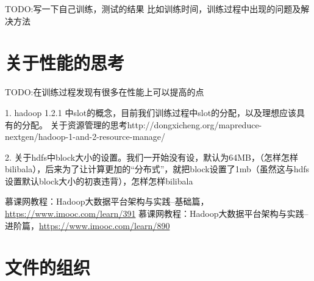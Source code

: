 \documentclass[forprint]{myreport}
\begin{document}
TODO:写一下自己训练，测试的结果
比如训练时间，训练过程中出现的问题及解决方法

\chapter{关于性能的思考}

TODO:在训练过程发现有很多在性能上可以提高的点

1. hadoop 1.2.1 中slot的概念，目前我们训练过程中slot的分配，以及理想应该具有的分配。
关于资源管理的思考http://dongxicheng.org/mapreduce-nextgen/hadoop-1-and-2-resource-manage/

2. 关于hdfs中block大小的设置。我们一开始没有设，默认为64MB，（怎样怎样bilibala），后来为了让计算更加的“分布式”，就把block设置了1mb（虽然这与hdfs设置默认block大小的初衷违背），怎样怎样bilibala


\cleardoublepage{}
{}




\begin{thebibliography}{00}
   慕课网教程：Hadoop大数据平台架构与实践--基础篇，\url{https://www.imooc.com/learn/391}
   慕课网教程：Hadoop大数据平台架构与实践--进阶篇，\url{https://www.imooc.com/learn/890}
\end{thebibliography}
\appendix

\chapter{文件的组织}

\cleardoublepage
\end{document}
